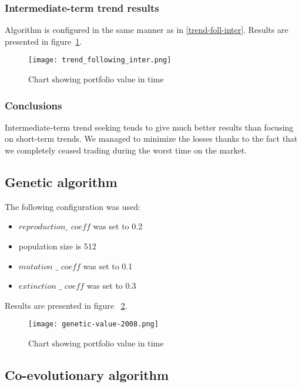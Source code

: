 \subsubsection{Intermediate-term trend results}

Algorithm is configured in the same manner as in \ref{trend-foll-inter}.
Results are presented in figure~\ref{fig:trend_foll_inter}.

\begin{figure}[ht]
  \begin{center}
    \texttt{[image: trend\_following\_inter.png]}
  \end{center}
  \caption{Chart showing portfolio value in time}
  \label{fig:trend_foll_inter}
\end{figure}


\subsubsection{Conclusions}

Intermediate-term trend seeking tends to give much better results than focusing on short-term trends.
We managed to minimize the losses thanks to the fact that we completely ceased trading during the worst time on the market.

\subsection{Genetic algorithm}

The following configuration was used:
\begin{itemize}
  \item $reproduction\_$ $coeff$ was set to 0.2
  \item population size is 512
  \item $mutation$ $\_$ $coeff$ was set to 0.1
  \item $extinction$ $\_$ $coeff$ was set to 0.3
\end{itemize}

Results are presented in figure ~\ref{fig:gen_2008}.

\begin{figure}[ht]
  \begin{center}
    \texttt{[image: genetic-value-2008.png]}
  \end{center}
  \caption{Chart showing portfolio value in time}
  \label{fig:gen_2008}
\end{figure}


\subsection{Co-evolutionary algorithm}

